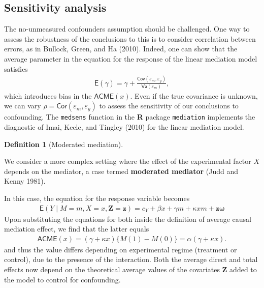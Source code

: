 \documentclass[
  11pt,
  letterpaper,
]{scrbook}
\theoremstyle{definition}
\newtheorem{definition}{Definition}[chapter]
\theoremstyle{definition}
\theoremstyle{remark}
\begin{document}
\subsection{Sensitivity analysis}\label{sensitivity-analysis}

The no-unmeasured confounders assumption should be challenged. One way
to assess the robustness of the conclusions to this is to consider
correlation between errors, as in Bullock, Green, and Ha (2010). Indeed,
one can show that the average parameter in the equation for the response
of the linear mediation model satisfies \begin{align*}
\mathsf{E}(\widehat{\gamma})= \gamma + \frac{\mathsf{Cov}(\varepsilon_m, \varepsilon_y)}{\mathsf{Va}(\varepsilon_m)},
\end{align*} which introduces bias in the \(\mathsf{ACME}(x)\). Even if
the true covariance is unknown, we can vary
\(\rho=\mathsf{Cor}(\varepsilon_m, \varepsilon_y)\) to assess the
sensitivity of our conclusions to confounding. The \texttt{medsens}
function in the \textbf{R} package \texttt{mediation} implements the
diagnostic of Imai, Keele, and Tingley (2010) for the linear mediation
model.

\begin{definition}[Moderated
mediation]\protect\hypertarget{def-moderated-mediation}{}\label{def-moderated-mediation}

We consider a more complex setting where the effect of the experimental
factor \(X\) depends on the mediator, a case termed \textbf{moderated
mediator} (Judd and Kenny 1981).

In this case, the equation for the response variable becomes
\begin{align*}
\mathsf{E}(Y \mid M=m, X=x, \boldsymbol{Z} = \boldsymbol{z}) = c_Y + \beta x + \gamma m + \kappa x m + \boldsymbol{z}\boldsymbol{\omega}
\end{align*} Upon substituting the equations for both inside the
definition of average causal mediation effect, we find that the latter
equals \begin{align*}
\mathsf{ACME}(x) = (\gamma + \kappa x)\{M(1)-M(0)\} = \alpha (\gamma + \kappa x).
\end{align*} and thus the value differs depending on experimental regime
(treatment or control), due to the presence of the interaction. Both the
average direct and total effects now depend on the theoretical average
values of the covariates \(\boldsymbol{Z}\) added to the model to
control for confounding.

\end{definition}
\end{document}
